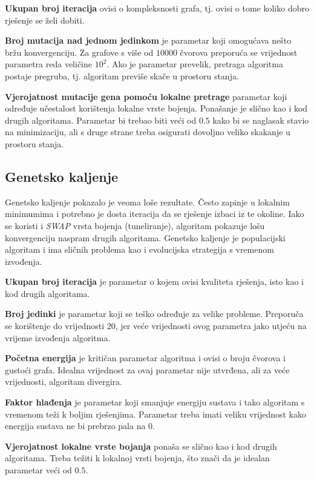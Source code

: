 \documentclass[times, utf8, diplomski, numeric]{fer}
\begin{document}
\textbf{Ukupan broj iteracija} ovisi o kompleksnosti grafa, tj. ovisi o tome koliko dobro rješenje se želi dobiti. 

\textbf{Broj mutacija nad jednom jedinkom} je parametar koji omogućava nešto bržu konvergenciju. Za grafove s više od $10000$ čvorova preporuća se vrijednost parametra reda veličine $10^2$. Ako je parametar prevelik, pretraga algoritma postaje pregruba, tj. algoritam previše skače u prostoru stanja.

\textbf{Vjerojatnost mutacije gena pomoću lokalne pretrage} parametar koji određuje učestalost korištenja lokalne vrste bojenja. Ponašanje je slično kao i kod drugih algoritama. Parametar bi trebao biti veći od $0.5$ kako bi se naglasak stavio na minimizaciju, ali s druge strane treba osigurati dovoljno veliko skakanje u prostoru stanja.

\subsection{Genetsko kaljenje}

Genetsko kaljenje pokazalo je veoma loše rezultate. Često zapinje u lokalnim minimumima i potrebno je dosta iteracija da se rješenje izbaci iz te okoline. Iako se koristi i \emph{SWAP} vrsta bojenja (tuneliranje), algoritam pokazuje lošu konvergenciju naspram drugih algoritama. Genetsko kaljenje je populacijski algoritam i ima sličnih problema kao i evolucijska strategija s vremenom izvođenja. 

\textbf{Ukupan broj iteracija} je parametar o kojem ovisi kvaliteta rješenja, isto kao i kod drugih algoritama.

\textbf{Broj jedinki} je parametar koji se teško određuje za velike probleme. Preporuča se korištenje do vrijednosti $20$, jer veće vrijednosti ovog parametra jako utjeću na vrijeme izvođenja algoritma.

\textbf{Početna energija} je kritičan parametar algoritma i ovisi o broju čvorova i gustoći grafa. Idealna vrijednost za ovaj parametar nije utvrđena, ali za veće vrijednosti, algoritam divergira.

\textbf{Faktor hlađenja} je parametar koji smanjuje energiju sustava i tako algoritam s vremenom teži k boljim rješenjima. Parametar treba imati veliku vrijednost kako energija sustava ne bi prebrzo pala na $0$.

\textbf{Vjerojatnost lokalne vrste bojanja} ponaša se slično kao i kod drugih algoritama. Treba težiti k lokalnoj vrsti bojenja, što znači da je idealan parametar veći od $0.5$.
\end{document}
